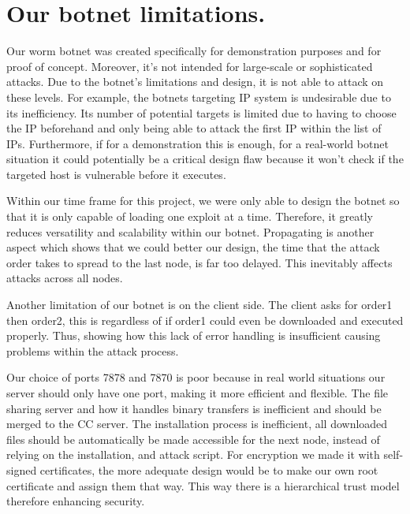 \documentclass[../main.tex]{subfiles}
\begin{document}
	\chapter{Our botnet limitations.}


    Our worm botnet was created specifically for demonstration purposes and for proof of concept. 
    Moreover, it's not intended for large-scale or sophisticated attacks. 
    Due to the botnet's limitations and design, it is not able to attack on these levels. 
    For example, the botnets targeting IP system is undesirable due to its inefficiency. 
    Its number of potential targets is limited due to having to choose the IP beforehand and only being able to attack the first IP within the list of IPs. 
    Furthermore, if for a demonstration this is enough, for a real-world botnet situation it could potentially be a critical design flaw because it won't check if the targeted host is vulnerable before it executes. 

    Within our time frame for this project, we were only able to design the botnet so that it is only capable of loading one exploit at a time. 
    Therefore, it greatly reduces versatility and scalability within our botnet. 
    Propagating is another aspect which shows that we could better our design, the time that the attack order takes to spread to the last node, is far too delayed. 
    This inevitably affects attacks across all nodes.

    Another limitation of our botnet is on the client side. 
    The client asks for order1 then order2, this is regardless of if order1 could even be downloaded and executed properly. 
    Thus, showing how this lack of error handling is insufficient causing problems within the attack process. 

    Our choice of ports 7878 and 7870 is poor because in real world situations our server should only have one port, making it more efficient and flexible. 
    The file sharing server and how it handles binary transfers is inefficient and should be merged to the CC server. 
    The installation process is inefficient, all downloaded files should be automatically be made accessible for the next node, instead of relying on the installation, and attack script. 
    For encryption we made it with self-signed certificates, the more adequate design would be to make our own root certificate and assign them that way. 
    This way there is a hierarchical trust model therefore enhancing security.
\end{document}
